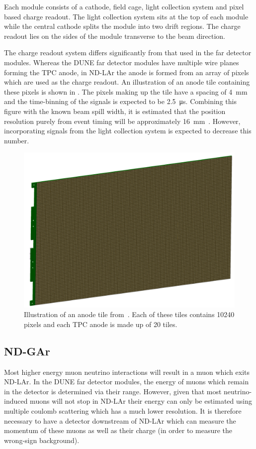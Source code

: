 Each module consists of a cathode, field cage, light collection system and pixel based charge readout.
The light collection system sits at the top of each module while the central cathode splits the module into two drift regions.
The charge readout lies on the sides of the module transverse to the beam direction.

The charge readout system differs significantly from that used in the far detector modules.
Whereas the DUNE far detector modules have multiple wire planes forming the TPC anode, in ND-LAr the anode is formed from an array of pixels which are used as the charge readout.
An illustration of an anode tile containing these pixels is shown in .
The pixels making up the tile have a spacing of \SI{4}{\milli\metre} and the time-binning of the signals is expected to be \SI{2.5}{\micro\second}.
Combining this figure with the known beam spill width, it is estimated that the position resolution purely from event timing will be approximately \SI{16}{\milli\metre}~\cite{ndCdr}.
However, incorporating signals from the light collection system is expected to decrease this number.

\begin{figure}[h]
  \centering
  \includegraphics[width=.7\linewidth]{files/figures/dune_detector/larpix}
  \caption[LArPix anode tile]{Illustration of an anode tile from~\cite{ndCdr}. Each of these tiles contains \num{10240} pixels and each TPC anode is made up of 20 tiles.}
  \label{fig:larpix}
\end{figure}

\subsection{ND-GAr}
\label{sec:dune:nd:gar}

Most higher energy muon neutrino interactions will result in a muon which exits ND-LAr.
In the DUNE far detector modules, the energy of muons which remain in the detector is determined via their range.
However, given that most neutrino-induced muons will not stop in ND-LAr their energy can only be estimated using multiple coulomb scattering which has a much lower resolution.
It is therefore necessary to have a detector downstream of ND-LAr which can measure the momentum of these muons as well as their charge (in order to measure the wrong-sign background).

